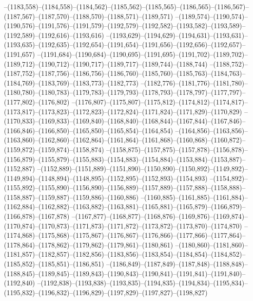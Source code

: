 --(1183,558)--(1184,558)--(1184,562)--(1185,562)--(1185,565)--(1186,565)--(1186,567)--(1187,567)--(1187,570)--(1188,570)--(1188,571)--(1189,571)
--(1189,574)--(1190,574)--(1190,576)--(1191,576)--(1191,579)--(1192,579)--(1192,582)--(1193,582)--(1193,589)--(1192,589)--(1192,616)--(1193,616)
--(1193,629)--(1194,629)--(1194,631)--(1193,631)--(1193,635)--(1192,635)--(1192,654)--(1191,654)--(1191,656)--(1192,656)--(1192,657)--(1191,657)
--(1191,684)--(1190,684)--(1190,695)--(1191,695)--(1191,702)--(1189,702)--(1189,712)--(1190,712)--(1190,717)--(1189,717)--(1189,744)--(1188,744)
--(1188,752)--(1187,752)--(1187,756)--(1186,756)--(1186,760)--(1185,760)--(1185,763)--(1184,763)--(1184,769)--(1183,769)--(1183,773)--(1182,773)
--(1182,776)--(1181,776)--(1181,780)--(1180,780)--(1180,783)--(1179,783)--(1179,793)--(1178,793)--(1178,797)--(1177,797)--(1177,802)--(1176,802)
--(1176,807)--(1175,807)--(1175,812)--(1174,812)--(1174,817)--(1173,817)--(1173,823)--(1172,823)--(1172,824)--(1171,824)--(1171,829)--(1170,829)
--(1170,833)--(1169,833)--(1169,840)--(1168,840)--(1168,844)--(1167,844)--(1167,846)--(1166,846)--(1166,850)--(1165,850)--(1165,854)--(1164,854)
--(1164,856)--(1163,856)--(1163,860)--(1162,860)--(1162,864)--(1161,864)--(1161,868)--(1160,868)--(1160,872)--(1159,872)--(1159,874)--(1158,874)
--(1158,875)--(1157,875)--(1157,878)--(1156,878)--(1156,879)--(1155,879)--(1155,883)--(1154,883)--(1154,884)--(1153,884)--(1153,887)--(1152,887)
--(1152,889)--(1151,889)--(1151,890)--(1150,890)--(1150,892)--(1149,892)--(1149,894)--(1148,894)--(1148,895)--(1152,895)--(1152,893)--(1154,893)
--(1154,892)--(1155,892)--(1155,890)--(1156,890)--(1156,889)--(1157,889)--(1157,888)--(1158,888)--(1158,887)--(1159,887)--(1159,886)--(1160,886)
--(1160,885)--(1161,885)--(1161,884)--(1162,884)--(1162,882)--(1163,882)--(1163,881)--(1165,881)--(1165,879)--(1166,879)--(1166,878)--(1167,878)
--(1167,877)--(1168,877)--(1168,876)--(1169,876)--(1169,874)--(1170,874)--(1170,873)--(1171,873)--(1171,872)--(1173,872)--(1173,870)--(1174,870)
--(1174,868)--(1175,868)--(1175,867)--(1176,867)--(1176,866)--(1177,866)--(1177,864)--(1178,864)--(1178,862)--(1179,862)--(1179,861)--(1180,861)
--(1180,860)--(1181,860)--(1181,857)--(1182,857)--(1182,856)--(1183,856)--(1183,854)--(1184,854)--(1184,852)--(1185,852)--(1185,851)--(1186,851)
--(1186,849)--(1187,849)--(1187,848)--(1188,848)--(1188,845)--(1189,845)--(1189,843)--(1190,843)--(1190,841)--(1191,841)--(1191,840)--(1192,840)
--(1192,838)--(1193,838)--(1193,835)--(1194,835)--(1194,834)--(1195,834)--(1195,832)--(1196,832)--(1196,829)--(1197,829)--(1197,827)--(1198,827)
